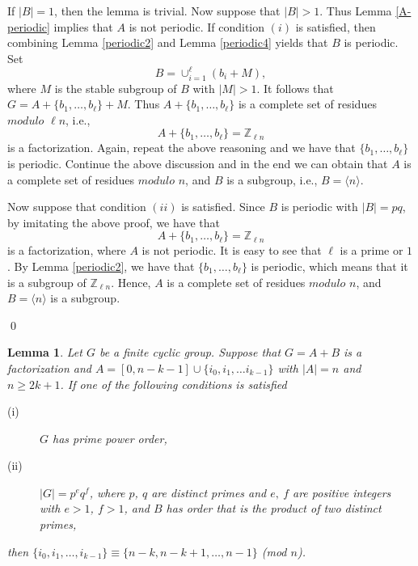 \documentclass[preprint]{elsarticle}
\newtheorem{lem}[thm]{Lemma}
\begin{document}
\pf
If $|B|=1$, then the lemma is trivial.
Now suppose that $|B|>1$.
Thus Lemma \ref{A-periodic} implies that $A$ is not periodic.
If condition $(i)$ is satisfied, then
combining Lemma \ref{periodic2} and Lemma \ref{periodic4} yields that $B$ is periodic.
Set $$B=\cup_{i=1}^{\ell}(b_i+M),$$
where $M$ is the stable subgroup of $B$ with $|M|>1$.
It follows that $G=A+\{b_1,\ldots,b_{\ell}\}+M$.
Thus $A+\{b_1,\ldots,b_{\ell}\}$ is a complete set of residues $modulo$ $\ell n$, i.e.,
$$A+\{b_1,\ldots,b_{\ell}\}=\mathbb{Z}_{\ell n}$$
is a factorization.
Again, repeat the above reasoning and we have that $\{b_1,\ldots,b_{\ell}\}$ is periodic.
Continue the above discussion and in the end we can obtain that $A$ is a complete set of residues $modulo$ $n$,
and $B$ is a subgroup, i.e., $B=\langle n\rangle$.

Now suppose that condition $(ii)$ is satisfied.
Since $B$ is periodic with $|B|=pq$, by imitating the above proof,
we have that $$A+\{b_1,\ldots,b_{\ell}\}=\mathbb{Z}_{\ell n}$$
is a factorization, where $A$ is not periodic.
It is easy to see that $\ell$ is a prime or $1$.
By Lemma \ref{periodic2}, we have that $\{b_1,\ldots,b_{\ell}\}$ is periodic, which means that it is a subgroup of $\mathbb{Z}_{\ell n}$.
Hence, $A$ is a complete set of residues $modulo$ $n$, and $B=\langle n\rangle$ is a subgroup.

\qed

\begin{lem}\label{Ethm}
Let $G$ be a finite cyclic group.
Suppose that $G = A+B$ is a factorization and $A=[0,n-k-1]\cup\{i_0,i_1,\ldots i_{k-1}\}$
with $|A|=n$ and $n\geq 2k+1$.
If one of the following conditions is satisfied
\begin{description}
  \item[(i)] $G$ has prime power order,
  \item[(ii)] $|G|=p^eq^f$, where $p$, $q$ are distinct primes and $e,\ f$ are positive integers with $e>1$, $f>1$, and $B$ has order that is the product of two distinct primes,
\end{description}
then $\{i_0,i_1,\ldots ,i_{k-1}\}\equiv \{n-k,n-k+1,\ldots ,n-1\}$ (mod $n$).
\end{lem}
\end{document}
